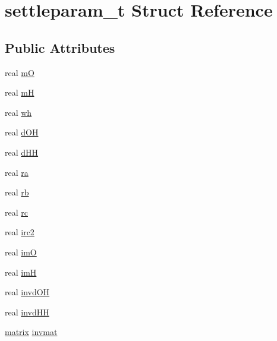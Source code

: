 \hypertarget{structsettleparam__t}{\section{settleparam\-\_\-t \-Struct \-Reference}
\label{structsettleparam__t}
}
\subsection*{\-Public \-Attributes}
\begin{DoxyCompactItemize}
\item 
real \hyperlink{structsettleparam__t_aa4d541e3e26eb6c3f111608247c4529e}{m\-O}
\item 
real \hyperlink{structsettleparam__t_aa8666a1bc8199e2d795d6dd158b9f5e5}{m\-H}
\item 
real \hyperlink{structsettleparam__t_acc04ca77c97945872b78cfa768c2a3c5}{wh}
\item 
real \hyperlink{structsettleparam__t_ac46c91ecaa9458c9d1b5b40e256bbbe3}{d\-O\-H}
\item 
real \hyperlink{structsettleparam__t_a821ef319b1fb240752555951695abff3}{d\-H\-H}
\item 
real \hyperlink{structsettleparam__t_a038e2ecb2ad0a2395dcead7dd5590a2f}{ra}
\item 
real \hyperlink{structsettleparam__t_a7a15e34f91aef175d36326257836c761}{rb}
\item 
real \hyperlink{structsettleparam__t_af46096098938e85722b17b8dedd73cde}{rc}
\item 
real \hyperlink{structsettleparam__t_a30c5b0a6be8f298e1db6a2660532c175}{irc2}
\item 
real \hyperlink{structsettleparam__t_a9ad8f7955e9937a7f2e672d2d3c95b4b}{im\-O}
\item 
real \hyperlink{structsettleparam__t_abbae60abfbee7f3a89899495dd773de5}{im\-H}
\item 
real \hyperlink{structsettleparam__t_a5ea1f620c736b47b3b1e59c71b38239b}{invd\-O\-H}
\item 
real \hyperlink{structsettleparam__t_af8b3c0b867a6a52e2ae72d7a9a4c4616}{invd\-H\-H}
\item 
\hyperlink{share_2template_2gromacs_2types_2simple_8h_a7ea9c2a830d3f743b887387e33645a83}{matrix} \hyperlink{structsettleparam__t_a69f11e4c35df8dc6c79d160495bc9ced}{invmat}
\end{DoxyCompactItemize}


